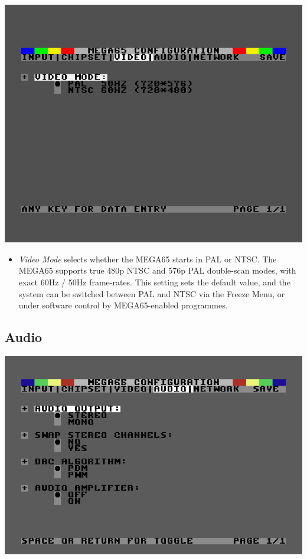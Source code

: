 \includegraphics[width=\linewidth]{images/ss-m65config-3.png}

\begin{itemize}
  \item{\em Video Mode} selects whether the MEGA65 starts in PAL or NTSC.
    The MEGA65 supports true 480p NTSC and 576p PAL double-scan modes,
    with exact 60Hz / 50Hz frame-rates.  This setting sets the
    default value, and the system can be switched between PAL and NTSC
    via the Freeze Menu, or under software control by MEGA65-enabled
    programmes.
\end{itemize}

\subsection{Audio}

\includegraphics[width=\linewidth]{images/ss-m65config-4.png}

